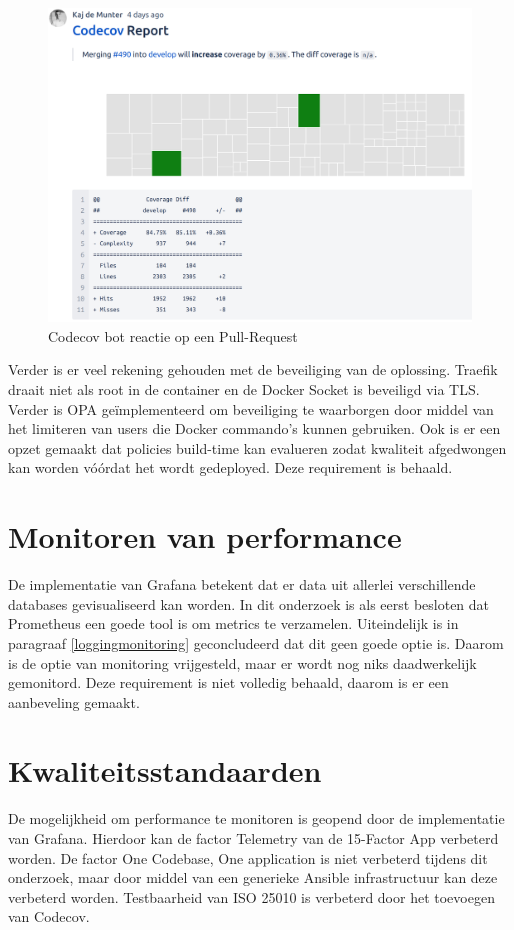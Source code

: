 \begin{figure}[H]
	\centering
	\includegraphics[width=13cm]{Figures/coverage}
	\decoRule
	\caption[Codecov bot]{Codecov bot reactie op een Pull-Request}
	\label{fig:coverage}
\end{figure}

Verder is er veel rekening gehouden met de beveiliging van de oplossing. Traefik draait niet als root in de container en de Docker Socket is beveiligd via TLS. Verder is OPA geïmplementeerd om beveiliging te waarborgen door middel van het limiteren van users die Docker commando's kunnen gebruiken. Ook is er een opzet gemaakt dat policies build-time kan evalueren zodat kwaliteit afgedwongen kan worden vóórdat het wordt gedeployed. Deze requirement is behaald.

\section{Monitoren van performance}

De implementatie van Grafana betekent dat er data uit allerlei verschillende databases gevisualiseerd kan worden. In dit onderzoek is als eerst besloten dat Prometheus een goede tool is om metrics te verzamelen. Uiteindelijk is in paragraaf \ref{loggingmonitoring} geconcludeerd dat dit geen goede optie is. Daarom is de optie van monitoring vrijgesteld, maar er wordt nog niks daadwerkelijk gemonitord. Deze requirement is niet volledig behaald, daarom is er een aanbeveling gemaakt.

\section{Kwaliteitsstandaarden}
De mogelijkheid om performance te monitoren is geopend door de implementatie van Grafana. Hierdoor kan de factor Telemetry van de 15-Factor App verbeterd worden. De factor One Codebase, One application is niet verbeterd tijdens dit onderzoek, maar door middel van een generieke Ansible infrastructuur kan deze verbeterd worden. Testbaarheid van ISO 25010 is verbeterd door het toevoegen van Codecov. 

